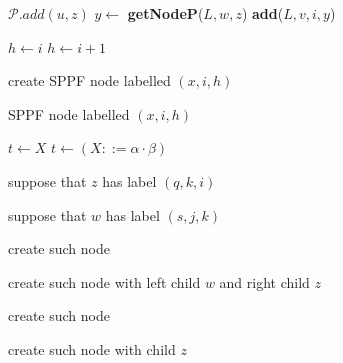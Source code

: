 \documentclass[runningheads,a4paper]{llncs}
\begin{document}
\begin{algorithmic}   
    \State $\mathcal{P}.add(u,z)$
    \State $y \gets$ \textbf{getNodeP}($L, w, z$)
    \State \textbf{add}($L,v,i,y$)
    \EndFor
    \EndIf
    \EndFunction
\end{algorithmic}

\begin{algorithmic}   
    \State $h \gets i$
    \Else
    \State $h \gets i + 1$
    \EndIf
    
    \State create SPPF node labelled $(x, i, h)$
    \EndIf
    
    \Return SPPF node labelled $(x, i, h)$
    
    \EndFunction
\end{algorithmic}
\vspace{9cm}
\begin{algorithmic}   
    \State {}
    \Else
    
    \If{($\beta = \epsilon$)}
    \State $t \gets X$
    \Else
    \State $t \gets (X ::=\alpha \cdot \beta)$
    \EndIf
    
    \State suppose that $z$ has label $(q, k, i)$
    
    \State suppose that $w$ has label $(s, j, k)$
    
    \State create such node
    \EndIf
    
    
    \State create such node with left child $w$ and right child $z$
    \EndIf
    
    \Else
    \State create such node
    \EndIf
    
    \State create such node with child $z$
    \EndIf
    
    \EndIf
           
    \State {}
    \EndIf
    \EndFunction
\end{algorithmic}
\vspace{9cm}
\end{document}
